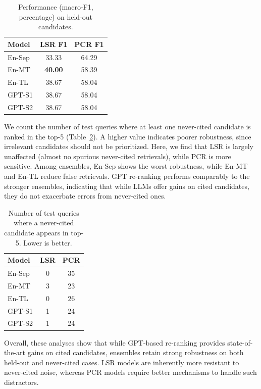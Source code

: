 \begin{table}[!ht]
\centering
\small
\begin{tabular}{lcc}
\toprule
\textbf{Model} & \textbf{LSR F1} & \textbf{PCR F1} \\
\midrule
En-Sep  & 33.33 & 64.29 \\
En-MT   & \textbf{40.00} & 58.39 \\
En-TL   & 38.67 & 58.04 \\
GPT-S1  & 38.67 & 58.04 \\
GPT-S2  & 38.67 & 58.04 \\
\bottomrule
\end{tabular}
\caption{Performance (macro-F1, percentage) on held-out candidates.}
\label{tab:heldout}
\end{table}

 We count the number of test queries where at least one never-cited candidate is ranked in the top-5 (Table~\ref{tab:nevercited}). A higher value indicates poorer robustness, since irrelevant candidates should not be prioritized. Here, we find that LSR is largely unaffected (almost no spurious never-cited retrievals), while PCR is more sensitive. Among ensembles, En-Sep shows the worst robustness, while En-MT and En-TL reduce false retrievals. GPT re-ranking performs comparably to the stronger ensembles, indicating that while LLMs offer gains on cited candidates, they do not exacerbate errors from never-cited ones.

\begin{table}[!ht]
\centering
\small
\begin{tabular}{lcc}
\toprule
\textbf{Model} & \textbf{LSR} & \textbf{PCR} \\
\midrule
En-Sep  & 0 & 35 \\
En-MT   & 3 & 23 \\
En-TL   & 0 & 26 \\
GPT-S1  & 1 & 24 \\
GPT-S2  & 1 & 24 \\
\bottomrule
\end{tabular}
\caption{Number of test queries where a never-cited candidate appears in top-5. Lower is better.}
\label{tab:nevercited}
\end{table}

\noindent Overall, these analyses show that while GPT-based re-ranking provides state-of-the-art gains on cited candidates, ensembles retain strong robustness on both held-out and never-cited cases. LSR models are inherently more resistant to never-cited noise, whereas PCR models require better mechanisms to handle such distractors.


